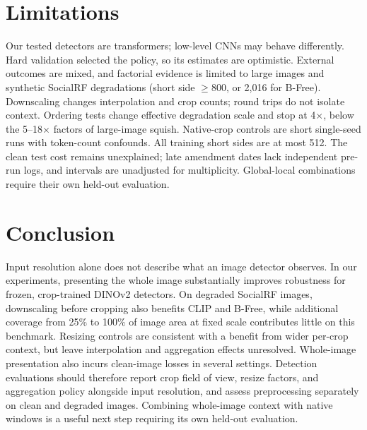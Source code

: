 \documentclass[letterpaper]{article} %
\begin{document}
\section{Limitations}

Our tested detectors are transformers; low-level CNNs may behave differently. Hard validation selected the policy, so its estimates are optimistic. External outcomes are mixed, and factorial evidence is limited to large images and synthetic SocialRF degradations (short side $\geq800$, or 2,016 for B-Free). Downscaling changes interpolation and crop counts; round trips do not isolate context. Ordering tests change effective degradation scale and stop at 4$\times$, below the 5--18$\times$ factors of large-image squish. Native-crop controls are short single-seed runs with token-count confounds. All training short sides are at most 512. The clean test cost remains unexplained; late amendment dates lack independent pre-run logs, and intervals are unadjusted for multiplicity. Global-local combinations \cite{mu2026hidanet,han2026glass} require their own held-out evaluation.

\section{Conclusion}

Input resolution alone does not describe what an image detector observes.
In our experiments, presenting the whole image substantially improves
robustness for frozen, crop-trained DINOv2 detectors. On degraded SocialRF
images, downscaling before cropping also benefits CLIP and B-Free, while
additional coverage from 25\% to 100\% of image area at fixed scale contributes little on this benchmark. Resizing controls
are consistent with a benefit from wider per-crop context, but leave
interpolation and aggregation effects unresolved. Whole-image presentation
also incurs clean-image losses in several settings. Detection evaluations
should therefore report crop field of view, resize factors, and aggregation
policy alongside input resolution, and assess preprocessing separately on
clean and degraded images. Combining whole-image context with native
windows is a useful next step requiring its own held-out evaluation.


\end{document}
